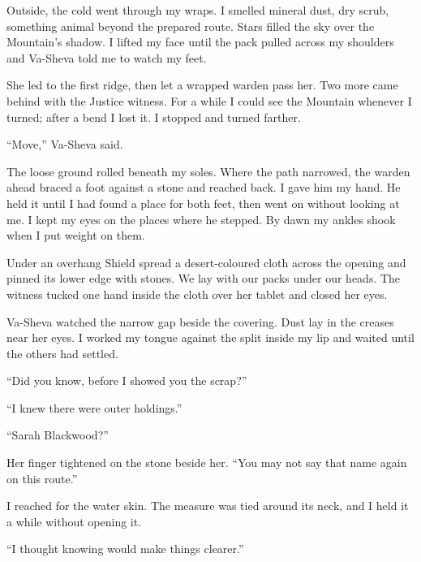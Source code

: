 \ornament

Outside, the cold went through my wraps. I smelled mineral dust, dry scrub, something animal beyond the prepared route. Stars filled the sky over the Mountain's shadow. I lifted my face until the pack pulled across my shoulders and Va-Sheva told me to watch my feet.\par

She led to the first ridge, then let a wrapped warden pass her. Two more came behind with the Justice witness. For a while I could see the Mountain whenever I turned; after a bend I lost it. I stopped and turned farther.\par

``Move,'' Va-Sheva said.\par

The loose ground rolled beneath my soles. Where the path narrowed, the warden ahead braced a foot against a stone and reached back. I gave him my hand. He held it until I had found a place for both feet, then went on without looking at me. I kept my eyes on the places where he stepped. By dawn my ankles shook when I put weight on them.\par

Under an overhang Shield spread a desert-coloured cloth across the opening and pinned its lower edge with stones. We lay with our packs under our heads. The witness tucked one hand inside the cloth over her tablet and closed her eyes.\par

Va-Sheva watched the narrow gap beside the covering. Dust lay in the creases near her eyes. I worked my tongue against the split inside my lip and waited until the others had settled.\par

``Did you know, before I showed you the scrap?''\par

``I knew there were outer holdings.''\par

``Sarah Blackwood?''\par

Her finger tightened on the stone beside her. ``You may not say that name again on this route.''\par

I reached for the water skin. The measure was tied around its neck, and I held it a while without opening it.\par

``I thought knowing would make things clearer.''\par

